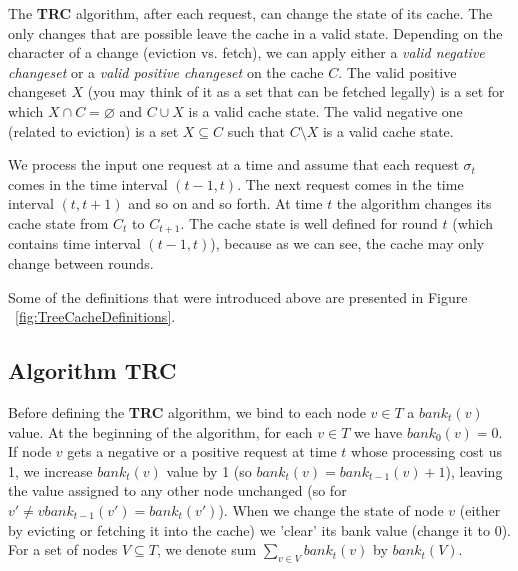The \textbf{TRC} algorithm, after each request, can change the state of its
cache. The only changes that are possible leave the cache in a valid state.
Depending on the character of a change (eviction vs. fetch), we can apply either a
\textit{valid negative changeset} or a \textit{valid positive changeset} on the
cache $C$. The valid positive changeset $X$ (you may think of it as a set that
can be fetched legally) is a set for which $X \cap C = \varnothing$ and $C \cup
X$ is a valid cache state. The valid negative one (related to eviction) is a set $X
\subseteq C$ such that $C \setminus X$ is a valid cache state.

We process the input one request at a time and assume that each request $\sigma_t$
comes in the time interval $(t-1, t)$. The next request comes in the time
interval $(t, t + 1)$ and so on and so forth. At time $t$ the algorithm changes its
cache state from $C_{t}$ to $C_{t+1}$. The cache state is well defined for round
$t$ (which contains time interval $(t-1, t)$), because as we can see, the cache
may only change between rounds.

Some of the definitions that were introduced above are presented in 
Figure ~\ref{fig:TreeCacheDefinitions}.



\subsection{Algorithm TRC}

Before defining the \textbf{TRC} algorithm, we bind to each node $v \in T$ a
$bank_{t}(v)$ value. At the beginning of the algorithm, for each $v \in T$ we
have $bank_{0}(v) = 0$. If node $v$ gets a negative or a positive request at
time $t$ whose processing cost us 1, we increase $bank_{t}(v)$ value by 1 (so
$bank_{t}(v) = bank_{t-1}(v) + 1$), leaving the value assigned to any other node
unchanged (so for $v' \neq v bank_{t-1}(v') = bank_{t}(v')$). When we change the
state of node $v$ (either by evicting or fetching it into the cache) we 'clear'
its bank value (change it to $0$). For a set of nodes $V \subseteq T$, we denote
sum $\sum_{v \in V} bank_{t}(v)$ by $bank_{t}(V)$.

